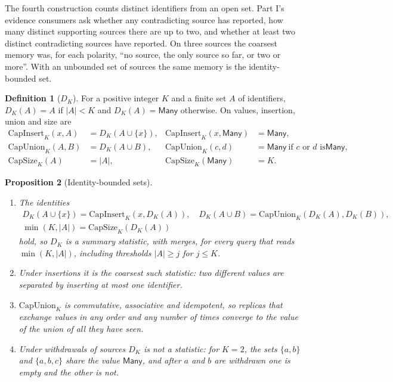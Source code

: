 \documentclass[11pt]{article}
\newcommand{\Many}{\mathsf{Many}}
\theoremstyle{definition}
\newtheorem{definition}{Definition}[section]
\theoremstyle{plain}
\newtheorem{proposition}[definition]{Proposition}
\begin{document}
The fourth construction counts distinct identifiers from an open set. Part I's evidence consumers
ask whether any contradicting source has reported, how many distinct supporting sources there are
up to two, and whether at least two distinct contradicting sources have reported. On three sources
the coarsest memory was, for each polarity, ``no source, the only source so far, or two or more''.
With an unbounded set of sources the same memory is the identity-bounded set.

\begin{definition}[$D_K$]
For a positive integer $K$ and a finite set $A$ of identifiers, $D_K(A)=A$ if $|A|<K$ and
$D_K(A)=\Many$ otherwise. On values, insertion, union and size are
\begin{align*}
\mathrm{CapInsert}_K(x,A)&=D_K(A\cup\{x\}), & \mathrm{CapInsert}_K(x,\Many)&=\Many,\\
\mathrm{CapUnion}_K(A,B)&=D_K(A\cup B), & \mathrm{CapUnion}_K(c,d)&=\Many\ \text{if $c$ or $d$ is
$\Many$},\\
\mathrm{CapSize}_K(A)&=|A|, & \mathrm{CapSize}_K(\Many)&=K.
\end{align*}
\end{definition}

\begin{proposition}[Identity-bounded sets]\label{prop:dk}
\leavevmode
\begin{enumerate}[label=(\roman*)]
\item The identities
  \begin{gather*}
  D_K(A\cup\{x\})=\mathrm{CapInsert}_K(x,D_K(A)),\quad
  D_K(A\cup B)=\mathrm{CapUnion}_K(D_K(A),D_K(B)),\\
  \min(K,|A|)=\mathrm{CapSize}_K(D_K(A))
  \end{gather*}
  hold, so $D_K$ is a summary statistic, with merges, for every query that reads $\min(K,|A|)$,
  including thresholds $|A|\ge j$ for $j\le K$.
\item Under insertions it is the coarsest such statistic: two different values are separated by
  inserting at most one identifier.
\item $\mathrm{CapUnion}_K$ is commutative, associative and idempotent, so replicas that exchange
  values in any order and any number of times converge to the value of the union of all they have
  seen.
\item Under withdrawals of sources $D_K$ is not a statistic: for $K=2$, the sets $\{a,b\}$ and
  $\{a,b,c\}$ share the value $\Many$, and after $a$ and $b$ are withdrawn one is empty and the other
  is not.
\end{enumerate}
\end{proposition}
\end{document}
